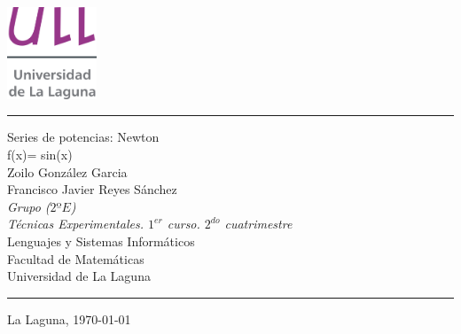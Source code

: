 \documentclass[spanish,a4paper,11pt,twoside]{report}
\begin{document}

\pagestyle{empty}
\thispagestyle{empty}


\newcommand{\HRule}{\rule{\linewidth}{1mm}}
\setlength{\parindent}{0mm}
\setlength{\parskip}{0mm}

\begin{center}
\includegraphics[width=0.2\textwidth]{images/logotipo-secundario-ULL}\\[0.25cm]
\end{center}

\HRule
\begin{center}
        {\Huge Series de potencias: Newton} \\[2.5mm] 
        {\Huge f(x)= sin(x)} \\[2.5mm]
        {\Large Zoilo González Garcia} \\[5mm]
        {\Large  Francisco Javier Reyes Sánchez} \\[5mm]
        {\Large \textit{Grupo ($2ºE$) }} \\[5mm]


        {\em Técnicas Experimentales. $1^{er}$ curso. $2^{do}$ cuatrimestre} \\[5mm]
        Lenguajes y Sistemas Informáticos \\[5mm]
        Facultad de Matemáticas \\[5mm]
        
        Universidad de La Laguna \\
\end{center}
\HRule
{}
\begin{center}
  La Laguna, \today 
\end{center}


\newpage{\pagestyle{empty}\cleardoublepage}
\end{document}
